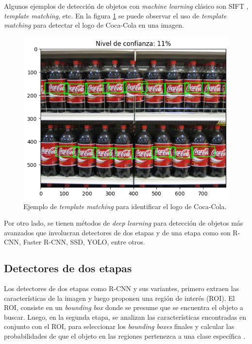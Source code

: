 Algunos ejemplos de detección de objetos con \textit{machine learning} clásico son SIFT \cite{ARTICLE:18}, \textit{template matching}, etc. En la figura \ref{fig:tempMatch} se puede observar el uso de \textit{template matching} para detectar el logo de Coca-Cola en una imagen.

\begin{figure}[ht]
	\centering
	\includegraphics[scale=.45]{./Figures/template_match.png}
	\caption{Ejemplo de \textit{template matching} para identificar el logo de Coca-Cola.}
	\label{fig:tempMatch}
\end{figure}
\newpage
Por otro lado, se tienen métodos de \textit{deep learning} para detección de objetos más avanzados que involucran detectores de dos etapas y de una etapa como son R-CNN, Faster R-CNN, SSD, YOLO, entre otros.

\subsection{Detectores de dos etapas}

Los detectores de dos etapas como R-CNN y sus variantes, primero extraen las características de la imagen y luego proponen una región de interés (ROI). El ROI, consiste en un \textit{bounding box} donde se presume que se encuentra el objeto a buscar. Luego, en la segunda etapa, se analizan las características encontradas en conjunto con el ROI, para seleccionar los \textit{bounding boxes} finales y calcular las probabilidades de que el objeto en las regiones pertenezca a una clase específica \cite{ARTICLE:8}. 

